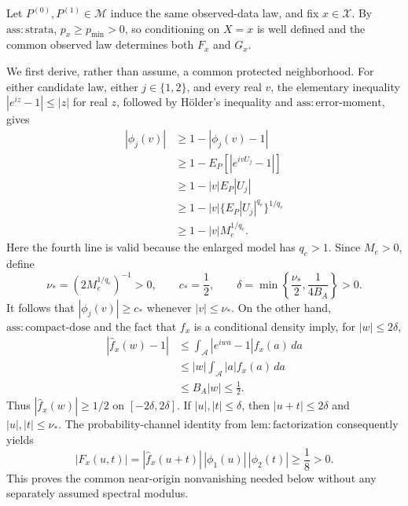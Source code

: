 Let \(P^{(0)},P^{(1)}\in\mathcal M\) induce the same observed-data law, and fix \(x\in\mathcal X\). By \(\mathrm{ass{:}strata}\), \(p_x\ge p_{\min}>0\), so conditioning on \(X=x\) is well defined and the common observed law determines both \(F_x\) and \(G_x\).

We first derive, rather than assume, a common protected neighborhood. For either candidate law, either \(j\in\{1,2\}\), and every real \(v\), the elementary inequality \(|e^{iz}-1|\le |z|\) for real \(z\), followed by H\"older's inequality and \(\mathrm{ass{:}error\text{-}moment}\), gives
\[
\begin{aligned}
 |\phi_j(v)|
 &\ge 1-|\phi_j(v)-1|\\
 &\ge 1-E_P\!\left[|e^{ivU_j}-1|\right]\\
 &\ge 1-|v|E_P|U_j|\\
 &\ge 1-|v|\{E_P|U_j|^{q_e}\}^{1/q_e}\\
 &\ge 1-|v|M_e^{1/q_e}.
\end{aligned}
\]
Here the fourth line is valid because the enlarged model has \(q_e>1\). Since \(M_e>0\), define
\[
 \nu_*=(2M_e^{1/q_e})^{-1}>0,
 \qquad c_*=\frac12,
 \qquad
 \delta=\min\left\{\frac{\nu_*}{2},\frac{1}{4B_A}\right\}>0.
\]
It follows that \(|\phi_j(v)|\ge c_*\) whenever \(|v|\le\nu_*\). On the other hand, \(\mathrm{ass{:}compact\text{-}dose}\) and the fact that \(f_x\) is a conditional density imply, for \(|w|\le2\delta\),
\[
\begin{aligned}
 |\widehat f_x(w)-1|
 &\le \int_{\mathcal A}|e^{iwa}-1|f_x(a)\,da\\
 &\le |w|\int_{\mathcal A}|a|f_x(a)\,da\\
 &\le B_A|w|\le\frac12.
\end{aligned}
\]
Thus \(|\widehat f_x(w)|\ge1/2\) on \([-2\delta,2\delta]\). If \(|u|,|t|\le\delta\), then \(|u+t|\le2\delta\) and \(|u|,|t|\le\nu_*\). The probability-channel identity from \(\mathrm{lem{:}factorization}\) consequently yields
\[
 |F_x(u,t)|
 =|\widehat f_x(u+t)|\,|\phi_1(u)|\,|\phi_2(t)|
 \ge \frac18>0.
\]
This proves the common near-origin nonvanishing needed below without any separately assumed spectral modulus.

